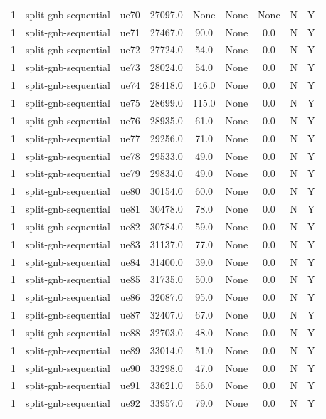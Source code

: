 \begin{table}[ht]
\begin{tabular}{|c|c|c|c|c|c|c|c|c|}
1 & split-gnb-sequential & ue70 & 27097.0 & None & None & None & N & Y \\
1 & split-gnb-sequential & ue71 & 27467.0 & 90.0 & None & 0.0 & N & Y \\
1 & split-gnb-sequential & ue72 & 27724.0 & 54.0 & None & 0.0 & N & Y \\
1 & split-gnb-sequential & ue73 & 28024.0 & 54.0 & None & 0.0 & N & Y \\
1 & split-gnb-sequential & ue74 & 28418.0 & 146.0 & None & 0.0 & N & Y \\
1 & split-gnb-sequential & ue75 & 28699.0 & 115.0 & None & 0.0 & N & Y \\
1 & split-gnb-sequential & ue76 & 28935.0 & 61.0 & None & 0.0 & N & Y \\
1 & split-gnb-sequential & ue77 & 29256.0 & 71.0 & None & 0.0 & N & Y \\
1 & split-gnb-sequential & ue78 & 29533.0 & 49.0 & None & 0.0 & N & Y \\
1 & split-gnb-sequential & ue79 & 29834.0 & 49.0 & None & 0.0 & N & Y \\
1 & split-gnb-sequential & ue80 & 30154.0 & 60.0 & None & 0.0 & N & Y \\
1 & split-gnb-sequential & ue81 & 30478.0 & 78.0 & None & 0.0 & N & Y \\
1 & split-gnb-sequential & ue82 & 30784.0 & 59.0 & None & 0.0 & N & Y \\
1 & split-gnb-sequential & ue83 & 31137.0 & 77.0 & None & 0.0 & N & Y \\
1 & split-gnb-sequential & ue84 & 31400.0 & 39.0 & None & 0.0 & N & Y \\
1 & split-gnb-sequential & ue85 & 31735.0 & 50.0 & None & 0.0 & N & Y \\
1 & split-gnb-sequential & ue86 & 32087.0 & 95.0 & None & 0.0 & N & Y \\
1 & split-gnb-sequential & ue87 & 32407.0 & 67.0 & None & 0.0 & N & Y \\
1 & split-gnb-sequential & ue88 & 32703.0 & 48.0 & None & 0.0 & N & Y \\
1 & split-gnb-sequential & ue89 & 33014.0 & 51.0 & None & 0.0 & N & Y \\
1 & split-gnb-sequential & ue90 & 33298.0 & 47.0 & None & 0.0 & N & Y \\
1 & split-gnb-sequential & ue91 & 33621.0 & 56.0 & None & 0.0 & N & Y \\
1 & split-gnb-sequential & ue92 & 33957.0 & 79.0 & None & 0.0 & N & Y \\

\end{tabular}
\end{table}
